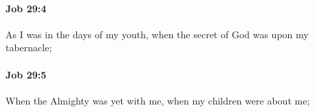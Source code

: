 		\paragraph{Job 29:4} %
			\label{JOB-29-4}

			As I was in the days of my youth, when the secret of God was upon my tabernacle;


		\paragraph{Job 29:5} %
			\label{JOB-29-5}

			When the Almighty was yet with me, when my children were about me;



